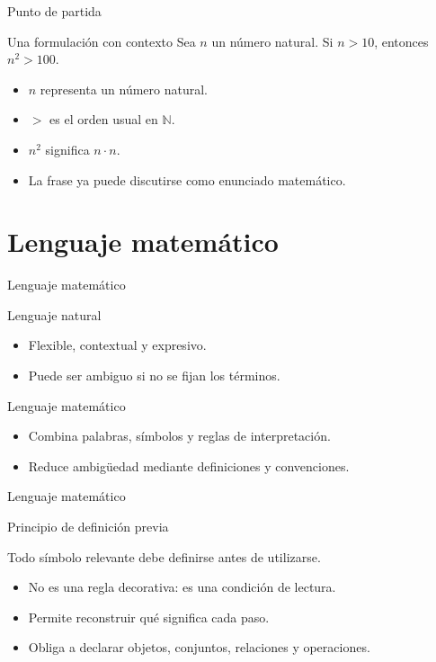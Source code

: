 \documentclass[aspectratio=169,11pt]{beamer}
\newcommand{\N}{\mathbb{N}}
\begin{document}
\begin{frame}{Punto de partida}
\begin{block}{Una formulación con contexto}
Sea \(n\) un número natural. Si \(n>10\), entonces \(n^2>100\).
\end{block}

\begin{itemize}
  \item \(n\) representa un número natural.
  \item \(>\) es el orden usual en \(\N\).
  \item \(n^2\) significa \(n\cdot n\).
  \item La frase ya puede discutirse como enunciado matemático.
\end{itemize}
\end{frame}

\section{Lenguaje matemático}

\begin{frame}{Lenguaje matemático}
\begin{block}{Lenguaje natural}
\begin{itemize}
  \item Flexible, contextual y expresivo.
  \item Puede ser ambiguo si no se fijan los términos.
\end{itemize}
\end{block}

\begin{block}{Lenguaje matemático}
\begin{itemize}
  \item Combina palabras, símbolos y reglas de interpretación.
  \item Reduce ambigüedad mediante definiciones y convenciones.
\end{itemize}
\end{block}
\end{frame}

\begin{frame}{Lenguaje matemático}
\begin{block}{Principio de definición previa}
\begin{center}
  \Large Todo símbolo relevante debe definirse antes de utilizarse.
\end{center}
\end{block}

\begin{itemize}
  \item No es una regla decorativa: es una condición de lectura.
  \item Permite reconstruir qué significa cada paso.
  \item Obliga a declarar objetos, conjuntos, relaciones y operaciones.
\end{itemize}
\end{frame}
\end{document}
